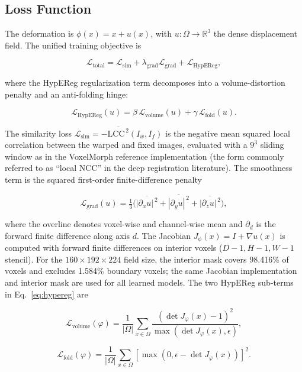 \documentclass[jimaging,article,submit,pdftex,moreauthors]{Definitions/mdpi}
\begin{document}
\subsection{Loss Function}
\label{sec:loss}
The deformation is \(\phi(x)=x+u(x)\), with \(u:\Omega\rightarrow\mathbb{R}^3\) the dense displacement field. The unified training objective is
\begin{linenomath}
\begin{equation}
\mathcal{L}_{\mathrm{total}}
=
\mathcal{L}_{\mathrm{sim}}
+
\lambda_{\mathrm{grad}}\mathcal{L}_{\mathrm{grad}}
+
\mathcal{L}_{\mathrm{HypEReg}},
\label{eq:total}
\end{equation}
\end{linenomath}
where the HypEReg regularization term decomposes into a volume-distortion penalty and an anti-folding hinge:
\begin{linenomath}
\begin{equation}
\mathcal{L}_{\mathrm{HypEReg}}(u)
=
\beta\,\mathcal{L}_{\mathrm{volume}}(u)
+
\gamma\,\mathcal{L}_{\mathrm{fold}}(u).
\label{eq:hypereg}
\end{equation}
\end{linenomath}
The similarity loss \(\mathcal{L}_{\mathrm{sim}}=-\overline{\mathrm{LCC}^{\,2}}(I_w,I_f)\) is the negative mean squared local correlation between the warped and fixed images, evaluated with a \(9^3\) sliding window as in the VoxelMorph reference implementation \cite{balakrishnan2019voxelmorph} (the form commonly referred to as ``local NCC'' in the deep registration literature). The smoothness term is the squared first-order finite-difference penalty
\begin{linenomath}
\begin{equation}
\mathcal{L}_{\mathrm{grad}}(u)
=
\tfrac{1}{3}\Big(\overline{|\partial_x u|^{\,2}}+\overline{|\partial_y u|^{\,2}}+\overline{|\partial_z u|^{\,2}}\Big),
\end{equation}
\end{linenomath}
where the overline denotes voxel-wise and channel-wise mean and \(\partial_d\) is the forward finite difference along axis \(d\). The Jacobian \(J_{\phi}(x)=I+\nabla u(x)\) is computed with forward finite differences on interior voxels (\(D-1, H-1, W-1\) stencil). For the \(160\times192\times224\) field size, the interior mask covers 98.416\% of voxels and excludes 1.584\% boundary voxels; the same Jacobian implementation and interior mask are used for all learned models. The two HypEReg sub-terms in Eq.~\eqref{eq:hypereg} are
\begin{linenomath}
\begin{equation}
\mathcal{L}_{\mathrm{volume}}(\varphi)=\frac{1}{|\Omega|}\sum_{x\in\Omega}\frac{(\det J_{\varphi}(x)-1)^2}{\max(\det J_{\varphi}(x),\epsilon)},
\end{equation}
\end{linenomath}
\begin{linenomath}
\begin{equation}
\mathcal{L}_{\mathrm{fold}}(\varphi)=\frac{1}{|\Omega|}\sum_{x\in\Omega}\left[\max(0,\epsilon-\det J_{\varphi}(x))\right]^2.
\end{equation}
\end{linenomath}
\end{document}
